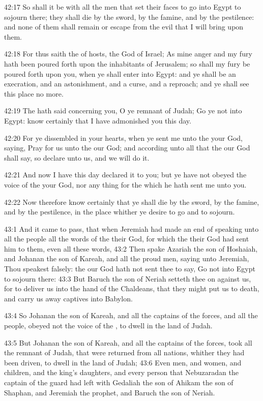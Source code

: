 42:17 So shall it be with all the men that set their faces to go into Egypt to sojourn there; they shall die by the sword, by the famine, and by the pestilence: and none of them shall remain or escape from the evil that I will bring upon them.

42:18 For thus saith the \LORD of hosts, the God of Israel; As mine anger and my fury hath been poured forth upon the inhabitants of Jerusalem; so shall my fury be poured forth upon you, when ye shall enter into Egypt: and ye shall be an execration, and an astonishment, and a curse, and a reproach; and ye shall see this place no more.

42:19 The \LORD hath said concerning you, O ye remnant of Judah; Go ye not into Egypt: know certainly that I have admonished you this day.

42:20 For ye dissembled in your hearts, when ye sent me unto the \LORD your God, saying, Pray for us unto the \LORD our God; and according unto all that the \LORD our God shall say, so declare unto us, and we will do it.

42:21 And now I have this day declared it to you; but ye have not obeyed the voice of the \LORD your God, nor any thing for the which he hath sent me unto you.

42:22 Now therefore know certainly that ye shall die by the sword, by the famine, and by the pestilence, in the place whither ye desire to go and to sojourn.

43:1 And it came to pass, that when Jeremiah had made an end of speaking unto all the people all the words of the \LORD their God, for which the \LORD their God had sent him to them, even all these words, 43:2 Then spake Azariah the son of Hoshaiah, and Johanan the son of Kareah, and all the proud men, saying unto Jeremiah, Thou speakest falsely: the \LORD our God hath not sent thee to say, Go not into Egypt to sojourn there: 43:3 But Baruch the son of Neriah setteth thee on against us, for to deliver us into the hand of the Chaldeans, that they might put us to death, and carry us away captives into Babylon.

43:4 So Johanan the son of Kareah, and all the captains of the forces, and all the people, obeyed not the voice of the \LORD, to dwell in the land of Judah.

43:5 But Johanan the son of Kareah, and all the captains of the forces, took all the remnant of Judah, that were returned from all nations, whither they had been driven, to dwell in the land of Judah; 43:6 Even men, and women, and children, and the king's daughters, and every person that Nebuzaradan the captain of the guard had left with Gedaliah the son of Ahikam the son of Shaphan, and Jeremiah the prophet, and Baruch the son of Neriah.


